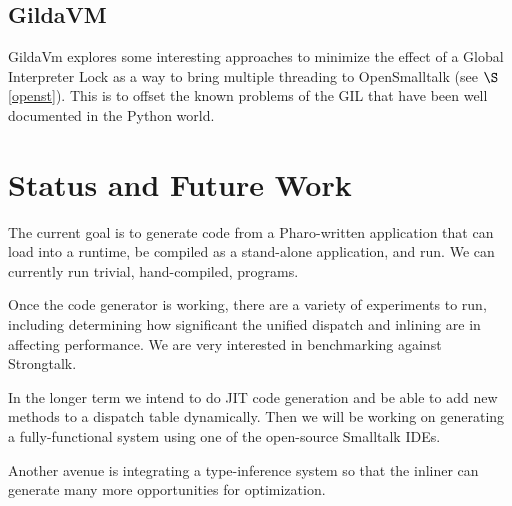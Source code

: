 \documentclass[
]{ceurart}
\def\secref{$\S$\ref}
\begin{document}
\subsection{GildaVM\cite{Polito2019GildaVMAN}}\label{gilda}
GildaVm explores some interesting approaches to minimize the effect of a Global Interpreter Lock as a way to bring multiple threading to OpenSmalltalk (see \secref{openst}).
This is to offset the known problems of the GIL that have been well documented in the Python world.

\section{Status and Future Work}
The current goal is to generate code from a Pharo-written application that can load into a runtime, be compiled as a stand-alone application, and run.
We can currently run trivial, hand-compiled, programs.

Once the code generator is working, there are a variety of experiments to run, including determining how significant the unified dispatch and inlining are in affecting performance.
We are very interested in benchmarking against Strongtalk.

In the longer term we intend to do JIT code generation and be able to add new methods to a dispatch table dynamically.
Then we will be working on generating a fully-functional system using one of the open-source Smalltalk IDEs.

Another avenue is integrating a type-inference system so that the inliner can generate many more opportunities for optimization.

%

\end{document}
